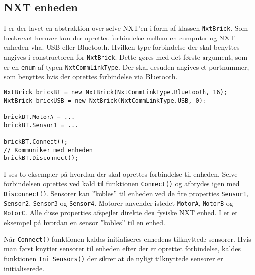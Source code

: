 \subsection{NXT enheden}
I \mindsqualls er der lavet en abstraktion over selve NXT'en i form af klassen \lstinline[style=csharp]!NxtBrick!.
Som beskrevet herover kan der oprettes forbindelse mellem en computer og NXT enheden vha. USB eller Bluetooth.
Hvilken type forbindelse der skal benyttes angives i constructoren for \lstinline[style=csharp]!NxtBrick!.
Dette gøres med det første argument, som er en \lstinline[style=csharp]!enum! af typen \lstinline[style=csharp]!NxtCommLinkType!.
Der skal desuden angives et portnummer, som benyttes hvis der oprettes forbindelse via Bluetooth.

\begin{lstlisting}[style=csharpsmall,caption={Forbindelse til NXT enheder},label=mindsqualls:connect]
NxtBrick brickBT = new NxtBrick(NxtCommLinkType.Bluetooth, 16);
NxtBrick brickUSB = new NxtBrick(NxtCommLinkType.USB, 0);

brickBT.MotorA = ...
brickBT.Sensor1 = ...

brickBT.Connect();
// Kommuniker med enheden
brickBT.Disconnect();
\end{lstlisting}

I  ses to eksempler på hvordan der skal oprettes forbindelse til enheden.
Selve forbindelsen oprettes ved kald til funktionen \lstinline[style=csharp]!Connect()! og afbrydes igen med \lstinline[style=csharp]!Disconnect()!.
Sensorer kan ''kobles'' til enheden ved de fire properties \lstinline[style=csharp]!Sensor1!, \lstinline[style=csharp]!Sensor2!, \lstinline[style=csharp]!Sensor3! og \lstinline[style=csharp]!Sensor4!.
Motorer anvender istedet \lstinline[style=csharp]!MotorA!, \lstinline[style=csharp]!MotorB! og \lstinline[style=csharp]!MotorC!.
Alle disse properties afspejler direkte den fysiske NXT enhed.
I  er et eksempel på hvordan en sensor ''kobles'' til en enhed.

Når \lstinline[style=csharp]!Connect()! funktionen kaldes initialiseres enhedens tilknyttede sensorer.
Hvis man først knytter sensorer til enheden efter der er oprettet forbindelse, kaldes funktionen \lstinline[style=csharp]!InitSensors()! der sikrer at de nyligt tilknyttede sensorer er initialiserede.

